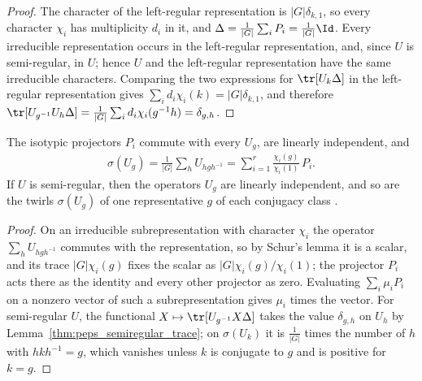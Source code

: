 \begin{proof}\leanok
    The character of the left-regular representation is $|G|\delta_{k,1}$,
    so every character $\chi_i$ has multiplicity $d_i$ in it, and
    $\Delta=\frac{1}{|G|}\sum_iP_i=\frac{1}{|G|}\Id$. Every
    irreducible representation occurs in the left-regular representation,
    and, since $U$ is semi-regular, in $U$; hence $U$ and the left-regular
    representation have the same irreducible characters. Comparing the two
    expressions for $\tr[U_k\Delta]$ in the left-regular representation gives
    $\sum_id_i\chi_i(k)=|G|\delta_{k,1}$, and therefore
    $\tr[U_{g^{-1}}U_h\Delta]=\frac{1}{|G|}\sum_id_i\chi_i(g^{-1}h)
        =\delta_{g,h}$.
\end{proof}

\begin{lemma}%
    \label{lem:peps_twirled_representation}
    \leanok
    The isotypic projectors $P_i$ commute with every $U_g$, are linearly
    independent, and
    \begin{align*}
        \sigma(U_g)=\frac{1}{|G|}\sum_hU_{hgh^{-1}}
        =\sum_{i=1}^{r}\frac{\chi_i(g)}{\chi_i(1)}\,P_i .
    \end{align*}
    If $U$ is semi-regular, then the operators $U_g$ are linearly independent,
    and so are the twirls $\sigma(U_g)$ of one representative $g$ of each
    conjugacy class \cite[proof of Theorem~4.12]{Schuch2010PEPS}.
\end{lemma}

\begin{proof}\leanok
    On an irreducible subrepresentation with character $\chi_i$ the operator
    $\sum_hU_{hgh^{-1}}$ commutes with the representation, so by Schur's lemma
    it is a scalar, and its trace $|G|\chi_i(g)$ fixes the scalar as
    $|G|\chi_i(g)/\chi_i(1)$; the projector $P_i$ acts there as the identity
    and every other projector as zero. Evaluating $\sum_i\mu_iP_i$ on a nonzero
    vector of such a subrepresentation gives $\mu_i$ times the vector. For
    semi-regular $U$, the functional $X\mapsto\tr[U_{g^{-1}}X\Delta]$ takes the
    value $\delta_{g,h}$ on $U_h$ by
    Lemma~\ref{thm:peps_semiregular_trace}; on $\sigma(U_k)$ it is
    $\frac{1}{|G|}$ times the number of $h$ with $hkh^{-1}=g$, which vanishes
    unless $k$ is conjugate to $g$ and is positive for $k=g$.
\end{proof}

